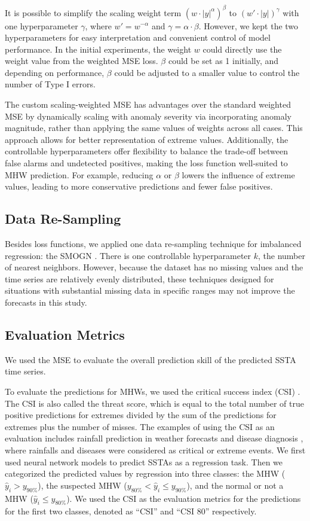\documentclass[11pt, a4paper]{article}
\begin{document}
It is possible to simplify the scaling weight term $(w\cdot |y|^{\alpha})^{\beta}$ to $(w'\cdot |y|)^{\gamma}$ with one hyperparameter $\gamma$, where $w'=w^{-\alpha}$ and $\gamma=\alpha\cdot\beta$. However, we kept the two hyperparameters for easy interpretation and convenient control of model performance. In the initial experiments, the weight $w$ could directly use the weight value from the weighted MSE loss. $\beta$ could be set as 1 initially, and depending on performance, $\beta$ could be adjusted to a smaller value to control the number of Type I errors.

The custom scaling-weighted MSE has advantages over the standard weighted MSE by dynamically scaling with anomaly severity via incorporating anomaly magnitude, rather than applying the same values of weights across all cases. This approach allows for better representation of extreme values. Additionally, the controllable hyperparameters offer flexibility to balance the trade-off between false alarms and undetected positives, making the loss function well-suited to MHW prediction. For example, reducing $\alpha$ or $\beta$ lowers the influence of extreme values, leading to more conservative predictions and fewer false positives.

\subsection{Data Re-Sampling}

Besides loss functions, we applied one data re-sampling technique for imbalanced regression: the SMOGN \citep{branco2017smogn}. There is one controllable hyperparameter $k$, the number of nearest neighbors. However, because the dataset has no missing values and the time series are relatively evenly distributed, these techniques designed for situations with substantial missing data in specific ranges may not improve the forecasts in this study.

\subsection{Evaluation Metrics}

We used the MSE to evaluate the overall prediction skill of the predicted SSTA time series.

To evaluate the predictions for MHWs, we used the critical success index (CSI) \citep{schaefer1990critical}. The CSI is also called the threat score, which is equal to the total number of true positive predictions for extremes divided by the sum of the predictions for extremes plus the number of misses. The examples of using the CSI as an evaluation includes rainfall prediction in weather forecasts \citep{pham2020development} and disease diagnosis \citep{larner2021assessing}, where rainfalls and diseases were considered as critical or extreme events. We first used neural network models to predict SSTAs as a regression task. Then we categorized the predicted values by regression into three classes: the MHW ($\hat{y}_i>y_{90\%}$), the suspected MHW ($y_{80\%}<\hat{y}_i\leq y_{90\%}$), and the normal or not a MHW ($\hat{y}_i\leq y_{80\%}$). We used the CSI as the evaluation metrics for the predictions for the first two classes, denoted as ``CSI'' and ``CSI 80'' respectively.
\end{document}
